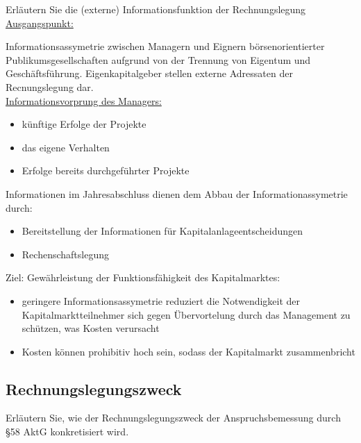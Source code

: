 \documentclass[paper=a4, fontsize=11pt]{scrartcl}
\numberwithin{equation}{section}
\numberwithin{figure}{section}
\numberwithin{table}{section}
\begin{document}
Erläutern Sie die (externe) Informationsfunktion der Rechnungslegung \\

\underline{Ausgangspunkt:}

Informationsassymetrie zwischen Managern und Eignern börsenorientierter Publikumsgesellschaften aufgrund von der Trennung von Eigentum und Geschäftsführung.
Eigenkapitalgeber stellen externe Adressaten der Recnungslegung dar. \\

\underline{Informationsvorprung des Managers:}

\begin{itemize}
  \item künftige Erfolge der Projekte
  \item das eigene Verhalten
  \item Erfolge bereits durchgeführter Projekte
\end{itemize}

Informationen im Jahresabschluss dienen dem Abbau der Informationassymetrie durch:

\begin{itemize}
  \item Bereitstellung der Informationen für Kapitalanlageentscheidungen
  \item Rechenschaftslegung
\end{itemize}

Ziel: Gewährleistung der Funktionsfähigkeit des Kapitalmarktes:

\begin{itemize}
  \item geringere Informationsassymetrie reduziert die Notwendigkeit der Kapitalmarktteilnehmer
  sich gegen Übervortelung durch das Management zu schützen, was Kosten verursacht
  \item Kosten können prohibitiv hoch sein, sodass der Kapitalmarkt zusammenbricht
\end{itemize}


\subsection{Rechnungslegungszweck}

Erläutern Sie, wie der Rechnungslegungszweck der Anspruchsbemessung durch \S 58 AktG konkretisiert wird. \\

\end{document}
